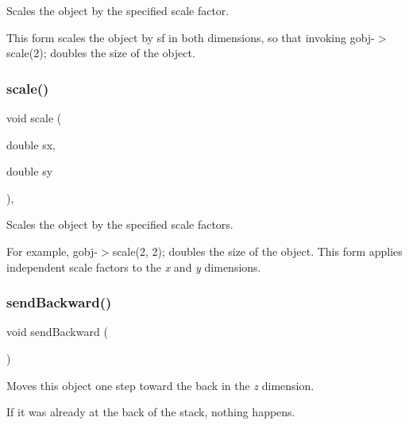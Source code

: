 Scales the object by the specified scale factor. 

This form scales the object by {\ttfamily sf} in both dimensions, so that invoking {\ttfamily gobj-\/$>$scale(2);} doubles the size of the object. \mbox{\label{classGObject_a63641f69d610d0b951357d35a0c3b1e3}} 
\subsubsection{\texorpdfstring{scale()}{scale()}\hspace{0.1cm}{\footnotesize\ttfamily [2/2]}}
{\footnotesize\ttfamily void scale (\begin{DoxyParamCaption}\item[{double}]{sx,  }\item[{double}]{sy }\end{DoxyParamCaption})\hspace{0.3cm}{\ttfamily [virtual]}, {\ttfamily [inherited]}}



Scales the object by the specified scale factors. 

For example, {\ttfamily gobj-\/$>$scale(2, 2);} doubles the size of the object. This form applies independent scale factors to the {\itshape x} and {\itshape y} dimensions. \mbox{\label{classGObject_ab6747f40313c531c2db32edb5b63b9b7}} 
\subsubsection{\texorpdfstring{send\+Backward()}{sendBackward()}}
{\footnotesize\ttfamily void send\+Backward (\begin{DoxyParamCaption}{ }\end{DoxyParamCaption})\hspace{0.3cm}{\ttfamily [inherited]}}



Moves this object one step toward the back in the {\itshape z} dimension. 

If it was already at the back of the stack, nothing happens. \mbox{\label{classGObject_a710b3e449c9facba7847c91ab170d281}} 
